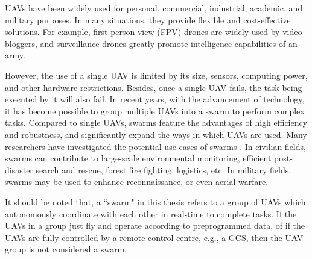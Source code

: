 
UAVs have been widely used for personal, commercial,
industrial, academic, and military purposes.
In many situations, they provide flexible and cost-effective solutions.
For example, first-person view (FPV) drones are widely used by video bloggers,
and surveillance drones greatly promote intelligence capabilities of an army.

However, the use of a single UAV is limited by its size,
sensors, computing power, and other hardware restrictions.
Besides, once a single UAV fails, the task being executed by it will also fail.
In recent years, with the advancement of technology,
it has become possible to group multiple UAVs into a swarm to perform complex tasks.
Compared to single UAVs, swarms feature the advantages of high efficiency and robustness,
and significantly expand the ways in which UAVs are used.
Many researchers have investigated the potential use cases
of swarms \parencite{Dimakos2024, Javaid2023, Ouyang2023, GAO2023, Zhou2020}.
In civilian fields, swarms can contribute to large-scale environmental monitoring,
efficient post-disaster search and rescue, forest fire fighting, logistics, etc.
In military fields, swarms may be used to enhance reconnaissance,
or even aerial warfare.

It should be noted that, a ``swarm" in this thesis refers to a group of UAVs
which autonomously coordinate with each other in real-time to complete tasks.
If the UAVs in a group just fly and operate according to preprogrammed data,
of if the UAVs are fully controlled by a remote control centre, e.g., a GCS,
then the UAV group is not considered a swarm.

